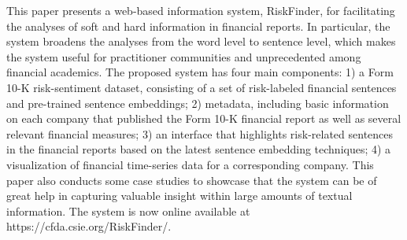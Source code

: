 This paper presents a web-based information system, RiskFinder, for facilitating the analyses of soft and hard information in financial reports. In particular, the system broadens the analyses from the word level to sentence level, which makes the system useful for practitioner communities and unprecedented among financial academics.  The proposed system has four main components: 1) a Form 10-K risk-sentiment dataset, consisting of a set of risk-labeled financial sentences and pre-trained sentence embeddings; 2) metadata, including basic information on each company that published the Form 10-K financial report as well as several relevant financial measures; 3) an interface that highlights risk-related sentences in the financial reports based on the latest sentence embedding techniques; 4) a visualization of financial time-series data for a corresponding company.  This paper also conducts some case studies to showcase that the system can be of great help in capturing valuable insight within large amounts of textual information.  The system is now online available at https://cfda.csie.org/RiskFinder/.
